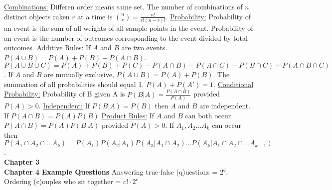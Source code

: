 \documentclass[9pt]{article}
\begin{document}
        \underline{Combinations:} Differen order means same set. The number of combinations of $n$ distinct objects raken $r$ at a time is $\binom{n}{r} = \frac{n!}{r!(n-r)!}$.
        \underline{Probability:} Probability of an event is the sum of all weights of all sample points in the event. Probability of an event is the number of outcomes corresponding to the event divided by total outcomes.
        \underline{Additive Rules:} If $A$ and $B$ are two events. $P(A\cup B) = P(A) + P(B) - P(A\cap B)$. $P(A\cup B\cup C) = P(A)+P(B)+P(C)-P(A\cap B) - P(A\cap C) - P(B\cap C) + P(A\cap B\cap C)$. If $A$ and $B$ are mutually exclusive, $P(A\cup B) = P(A) + P(B)$. The summation of all probabilities should equal 1. $P(A) + P(A') = 1$.
        \underline{Conditional Probability:} Probability of B given A is $P(B|A)=\frac{P(A\cap B)}{P(A)}$ provided $P(A) > 0$.
        \underline{Independent:} If $P(B|A) = P(B)$ then $A$ and $B$ are independent. If $P(A\cap B)=P(A)P(B)$
        \underline{Product Rules:} If $A$ and $B$ can both occur. $P(A\cap B) = P(A)P(B|A)$ provided $P(A)>0$. If $A_1,A_2...A_k$ can occur then $P(A_1\cap A_2\cap ... A_k) = P(A_1)P(A_2|A_1)P(A_3|A_1\cap A_2)...P(A_k|A_1\cap A_2\cap ... A_{k-1})$.
    \\
    \noindent\textbf{Chapter 3}
    \\
    \noindent\textbf{Chapter 4}
    \noindent\textbf{Example Questions} 
        Answering true-false (q)uestions = $2^{q}$.
        Ordering (c)ouples who sit together = $c!\cdot 2^c$
\end{document}
